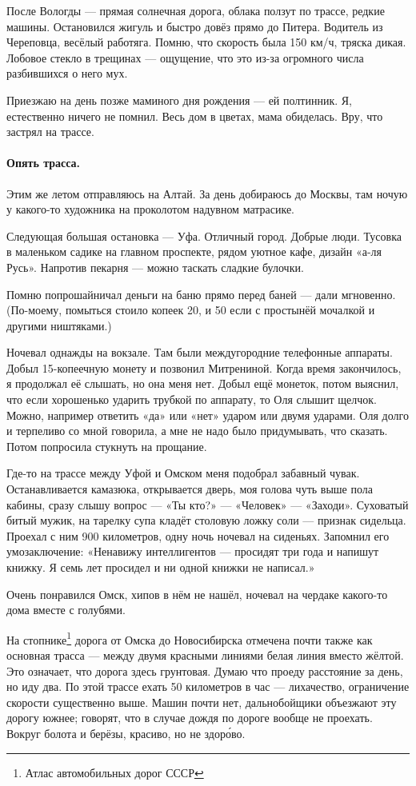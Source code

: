 \documentclass{book}
\begin{document}
После Вологды ---
прямая солнечная дорога, 
облака ползут по трассе,
редкие машины.
Остановился жигуль и быстро довёз прямо до Питера.
Водитель из Череповца, весёлый работяга.
Помню, что скорость была 150 км/ч, тряска дикая.
Лобовое стекло в трещинах ---
ощущение, что это из-за огромного числа разбившихся о него мух.

Приезжаю на день позже маминого дня рождения 
--- ей полтинник.
Я, естественно ничего не помнил.
Весь дом в цветах, мама обиделась. 
Вру, что застрял на трассе.

\paragraph{Опять трасса.}
Этим же летом отправляюсь на Алтай.
За день добираюсь до Москвы,
там ночую у какого-то художника на проколотом надувном матрасике.

Следующая большая остановка --- Уфа.
Отличный город. 
Добрые люди.
Тусовка в маленьком садике на главном проспекте,
рядом уютное кафе, дизайн «а-ля Русь».
Напротив пекарня --- можно таскать сладкие булочки.

Помню попрошайничал деньги на баню прямо перед баней --- дали мгновенно.
(По-моему, помыться стоило копеек 20, и 50 если с простынёй мочалкой и другими ништяками.)

Ночевал однажды на вокзале.
Там были междугородние телефонные аппараты.
Добыл 15-копеечную монету и позвонил Митрениной.
Когда время закончилось, я продолжал её слышать, но она меня нет.
Добыл ещё монеток, потом выяснил, что если хорошенько ударить трубкой по аппарату, то Оля слышит щелчок.
Можно, например ответить «да» или «нет» ударом или двумя ударами.
Оля долго и терпеливо со мной говорила, а мне не надо было придумывать, что сказать.
Потом попросила стукнуть на прощание. 

Где-то на трассе между Уфой и Омском меня подобрал забавный чувак.
Останавливается камазюка, открывается дверь, моя голова чуть выше пола кабины, сразу слышу вопрос --- «Ты кто?» --- «Человек» --- «Заходи».
Суховатый битый мужик, на тарелку супа кладёт столовую ложку соли --- признак сидельца.
Проехал с ним 900 километров, одну ночь ночевал на сиденьях.
Запомнил его умозаключение:
«Ненавижу интеллигентов --- просидят три года и напишут книжку.
Я семь лет просидел и ни одной книжки не написал.»

Очень понравился Омск, хипов в нём не нашёл, ночевал на чердаке какого-то дома вместе с голубями.

На стопнике\footnote{Атлас автомобильных дорог СССР} дорога от Омска до Новосибирска отмечена почти также как основная трасса --- между двумя красными линиями белая линия вместо жёлтой. 
Это означает, что дорога здесь грунтовая.
Думаю что проеду расстояние за день, но иду два.
По этой трассе ехать 50 километров в час --- лихачество, ограничение скорости существенно выше.
Машин почти нет, дальнобойщики объезжают эту дорогу южнее;
говорят, что в случае дождя по дороге вообще не проехать.
Вокруг болота и берёзы, красиво, но не здор\'{о}во.
\end{document}
